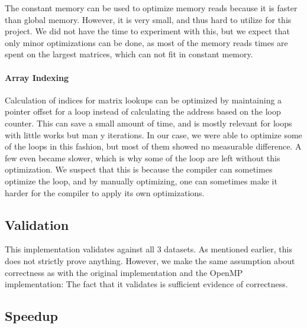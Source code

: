 \documentclass[11pt]{article}
\begin{document}
The constant memory can be used to optimize memory reads because it is faster than global memory.
However, it is very small, and thus hard to utilize for this project.
We did not have the time to experiment with this, but we expect that only minor optimizations can be done, as most of the memory reads times are spent on the largest matrices, which can not fit in constant memory.

\paragraph{Array Indexing\\}

Calculation of indices for matrix lookups can be optimized by maintaining a pointer offset for a loop instead of calculating the address based on the loop counter.
This can save a small amount of time, and is mostly relevant for loops with little works but man y iterations.
In our case, we were able to optimize some of the loops in this fashion, but most of them showed no measurable difference.
A few even became slower, which is why some of the loop are left without this optimization.
We suspect that this is because the compiler can sometimes optimize the loop, and by manually optimizing, one can sometimes make it harder for the compiler to apply its own optimizations.

\subsection{Validation}
This implementation validates against all 3 datasets. As mentioned earlier, this does not strictly prove anything. However, we make the same assumption about correctness as with the 
original implementation and the OpenMP implementation: The fact that it 
validates is sufficient evidence of correctness.

\subsection{Speedup}
\end{document}
